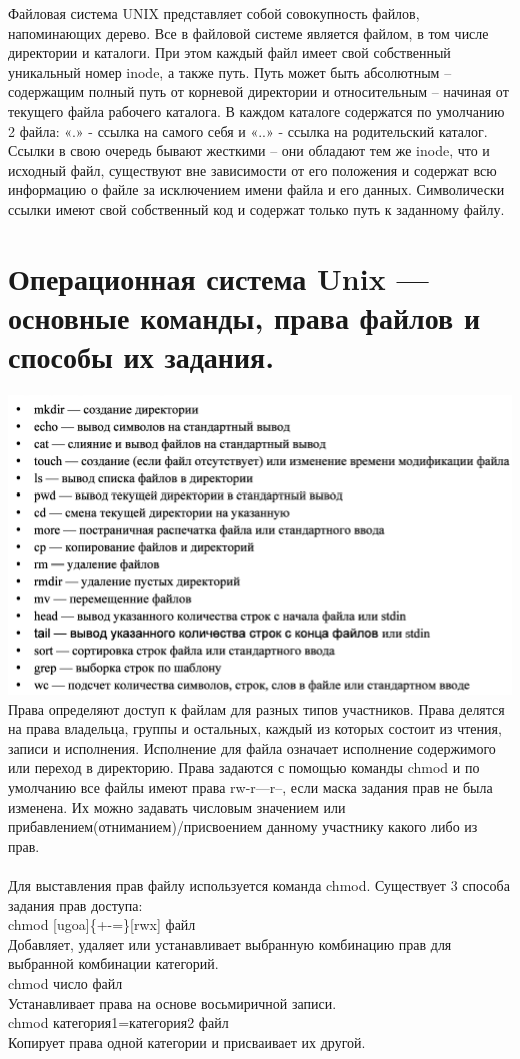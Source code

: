 \documentclass{article}
\begin{document}
Файловая система UNIX представляет собой совокупность файлов, напоминающих дерево. 
Все в файловой системе является файлом, в том числе директории и каталоги. 
При этом каждый файл имеет свой собственный уникальный номер inode, а также путь. 
Путь может быть абсолютным – содержащим полный путь от корневой директории и относительным – начиная от текущего файла рабочего каталога. 
В каждом каталоге содержатся по умолчанию 2 файла: «.» - ссылка на самого себя и «..» - ссылка на родительский каталог. 
Ссылки в свою очередь бывают жесткими – они обладают тем же inode, что и исходный файл, существуют вне зависимости от его положения и содержат всю информацию о файле за исключением имени файла и его данных. 
Символически ссылки имеют свой собственный код и содержат только путь к заданному файлу.




\section{Операционная система Unix — основные команды, права файлов и способы их задания.}
\includegraphics[width=.7\textwidth]{unixkom.png}\\
Права определяют доступ к файлам для разных типов участников. 
Права делятся на права владельца, группы и остальных, каждый из которых состоит из чтения, записи и исполнения. 
Исполнение для файла означает исполнение содержимого или переход в директорию. 
Права задаются с помощью команды chmod и по умолчанию все файлы имеют права rw-r—r--, если маска задания прав не была изменена. 
Их можно задавать числовым значением или прибавлением(отниманием)/присвоением данному участнику какого либо из прав.
\\
\\Для выставления прав файлу используется команда chmod. Существует 3 способа задания прав доступа:
\\chmod [ugoa]\{+-=\}[rwx] файл
\\Добавляет, удаляет или устанавливает выбранную комбинацию прав для выбранной комбинации категорий.
\\chmod число файл
\\Устанавливает права на основе восьмиричной записи.
\\chmod категория1=категория2 файл
\\Копирует права одной категории и присваивает их другой.
\end{document}
